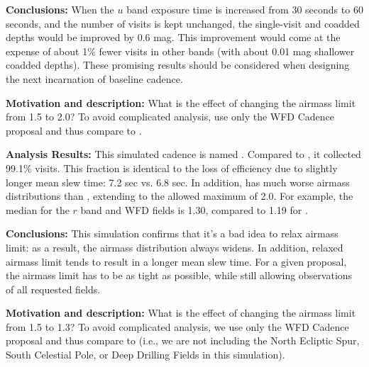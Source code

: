 {\bf Conclusions:} When the $u$ band exposure time is increased from
30 seconds to 60 seconds, and the number of visits is kept unchanged,
the single-visit and coadded depths would be improved by 0.6 mag. This
improvement would come at the expense of about 1\% fewer visits in
other bands (with about 0.01 mag shallower coadded depths). These
promising results should be considered when designing the next
incarnation of baseline cadence.



{\bf Motivation and description:}  What is the effect of changing the
airmass limit from 1.5 to 2.0?  To avoid complicated analysis, use
only the WFD Cadence proposal and thus compare to
.


{\bf Analysis Results:}  This simulated cadence is named
.  Compared to
, it collected 99.1\% visits. This fraction is
identical to the loss of efficiency due to slightly longer mean slew
time: 7.2 sec vs. 6.8 sec. In addition,
 has much worse airmass
distributions than , extending to the allowed
maximum of 2.0. For example, the median for the $r$ band and WFD fields
is 1.30, compared to 1.19 for .

{\bf Conclusions:} This simulation confirms that it's a bad idea to
relax airmass limit: as a result, the airmass distribution always
widens. In addition, relaxed airmass limit tends to result in a longer
mean slew time.  For a given proposal, the airmass limit has to be as
tight as possible, while still allowing observations of all requested
fields.




{\bf Motivation and description:} What is the effect of changing the airmass
limit from 1.5 to 1.3? To avoid complicated analysis, we use only the WFD
Cadence proposal and thus compare to  (i.e., we are not
including the North Ecliptic Spur, South Celestial Pole, or Deep Drilling Fields
in this simulation).

